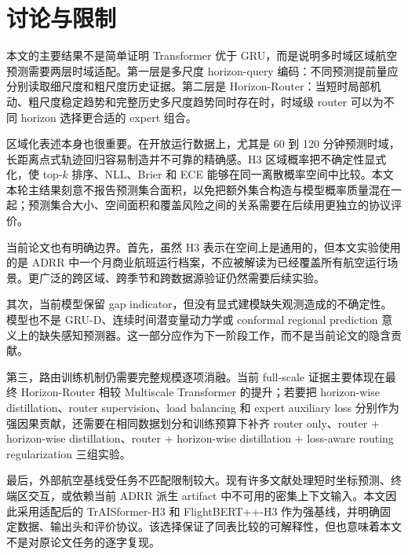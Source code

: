 \section{讨论与限制}

本文的主要结果不是简单证明 Transformer 优于 GRU，而是说明多时域区域航空预测需要两层时域适配。第一层是多尺度 horizon-query 编码：不同预测提前量应分别读取细尺度和粗尺度历史证据。第二层是 Horizon-Router：当短时局部机动、粗尺度稳定趋势和完整历史多尺度趋势同时存在时，时域级 router 可以为不同 horizon 选择更合适的 expert 组合。

区域化表述本身也很重要。在开放运行数据上，尤其是 60 到 120 分钟预测时域，长距离点式轨迹回归容易制造并不可靠的精确感。H3 区域概率把不确定性显式化，使 top-$k$ 排序、NLL、Brier 和 ECE 能够在同一离散概率空间中比较。本文本轮主结果刻意不报告预测集合面积，以免把额外集合构造与模型概率质量混在一起；预测集合大小、空间面积和覆盖风险之间的关系需要在后续用更独立的协议评价。

当前论文也有明确边界。首先，虽然 H3 表示在空间上是通用的，但本文实验使用的是 ADRR 中一个月商业航班运行档案，不应被解读为已经覆盖所有航空运行场景。更广泛的跨区域、跨季节和跨数据源验证仍然需要后续实验。

其次，当前模型保留 gap indicator，但没有显式建模缺失观测造成的不确定性。模型也不是 GRU-D、连续时间潜变量动力学或 conformal regional prediction 意义上的缺失感知预测器。这一部分应作为下一阶段工作，而不是当前论文的隐含贡献。

第三，路由训练机制仍需要完整规模逐项消融。当前 full-scale 证据主要体现在最终 Horizon-Router 相较 Multiscale Transformer 的提升；若要把 horizon-wise distillation、router supervision、load balancing 和 expert auxiliary loss 分别作为强因果贡献，还需要在相同数据划分和训练预算下补齐 router only、router + horizon-wise distillation、router + horizon-wise distillation + loss-aware routing regularization 三组实验。

最后，外部航空基线受任务不匹配限制较大。现有许多文献处理短时坐标预测、终端区交互，或依赖当前 ADRR 派生 artifact 中不可用的密集上下文输入。本文因此采用适配后的 TrAISformer-H3 和 FlightBERT++-H3 作为强基线，并明确固定数据、输出头和评价协议。该选择保证了同表比较的可解释性，但也意味着本文不是对原论文任务的逐字复现。
